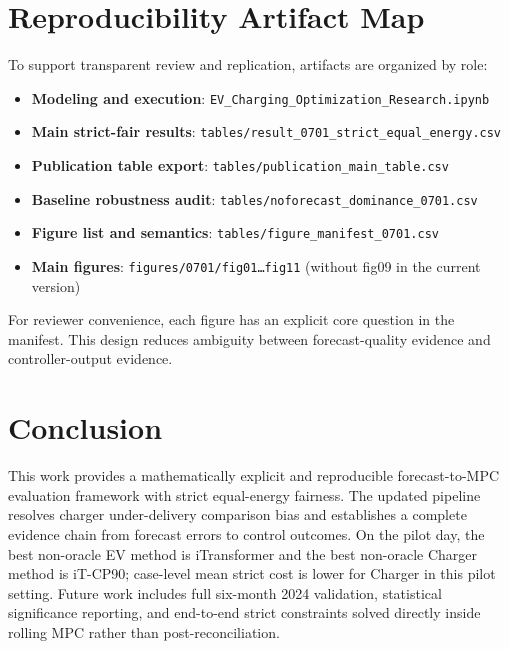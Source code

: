 \documentclass[journal]{IEEEtran}
\begin{document}
\section{Reproducibility Artifact Map}
To support transparent review and replication, artifacts are organized by role:
\begin{itemize}
    \item \textbf{Modeling and execution}: \texttt{EV\_Charging\_Optimization\_Research.ipynb}
    \item \textbf{Main strict-fair results}: \texttt{tables/result\_0701\_strict\_equal\_energy.csv}
    \item \textbf{Publication table export}: \texttt{tables/publication\_main\_table.csv}
    \item \textbf{Baseline robustness audit}: \texttt{tables/noforecast\_dominance\_0701.csv}
    \item \textbf{Figure list and semantics}: \texttt{tables/figure\_manifest\_0701.csv}
    \item \textbf{Main figures}: \texttt{figures/0701/fig01\dots fig11} (without fig09 in the current version)
\end{itemize}

For reviewer convenience, each figure has an explicit core question in the manifest. This design reduces ambiguity between forecast-quality evidence and controller-output evidence.

\section{Conclusion}
This work provides a mathematically explicit and reproducible forecast-to-MPC evaluation framework with strict equal-energy fairness. The updated pipeline resolves charger under-delivery comparison bias and establishes a complete evidence chain from forecast errors to control outcomes. On the pilot day, the best non-oracle EV method is iTransformer and the best non-oracle Charger method is iT-CP90; case-level mean strict cost is lower for Charger in this pilot setting. Future work includes full six-month 2024 validation, statistical significance reporting, and end-to-end strict constraints solved directly inside rolling MPC rather than post-reconciliation.

\appendices
\end{document}
